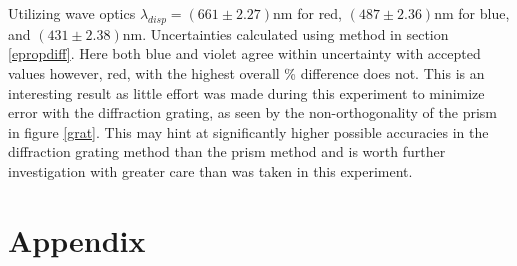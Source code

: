 \documentclass[10pt, twocolumn]{article}
\theoremstyle{definition}
\begin{document}
Utilizing wave optics $\lambda_{disp}=(661 \pm 2.27)\unit{\nano\meter}$ for red, $(487\pm2.36)\unit{\nano\meter}$ for blue, and $(431\pm2.38)\unit{\nano\meter}$.
Uncertainties calculated using method in section \ref{epropdiff}. Here both blue and violet agree within uncertainty with accepted values however, red, with the highest
overall \% difference does not. This is an interesting result as little effort was made during this experiment to minimize error with the diffraction grating,
as seen by the non-orthogonality of the prism in figure \ref{grat}. This may hint at significantly higher possible accuracies in the diffraction grating method than
the prism method and is worth further investigation with greater care than was taken in this experiment.

\section{Appendix}
\end{document}
